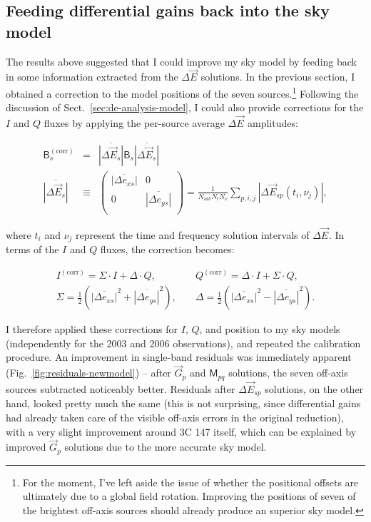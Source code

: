 \documentclass{aa}
\newcommand{\matrixtt}[4]{\left( \begin{array}{cc}#1&#2\\#3&#4\\\end{array} \right)}
\newcommand{\jones}[2]{\vec {#1}_{#2}}
\newcommand{\coh}[2]{\mathsf{{#1}}_{{#2}}}
\begin{document}
\subsection{Feeding differential gains back into the sky model\label{sec:model-improvement}}

The results above suggested that I could improve my sky model by feeding back in some information extracted from the $\Delta\jones{E}{}$ solutions. In the previous section, I obtained a correction to the model positions of the seven sources.\footnote{For the moment, I've left aside the issue of whether the positional offsets are ultimately due to a global field rotation. Improving the positions of seven of the brightest off-axis sources should already produce an superior sky model.} Following the discussion of Sect.~\ref{sec:de-analysis-model}, I could also provide corrections for the $I$ and $Q$ fluxes by applying the per-source average $\Delta\jones{E}{}$ amplitudes:

\begin{eqnarray*}
\coh{B}{s}^\mathrm{(corr)} & = & \overline{|\Delta\jones{E}{s}|} \coh{B}{s} \overline{|\Delta\jones{E}{s}|} \\
\overline{|\Delta\jones{E}{s}|} & \equiv & \matrixtt{\overline{|\Delta e_{xs}|}}{0}{0}{\overline{|\Delta e_{ys}|}} = \frac{1}{N_\mathrm{ant}N_t N_\nu} \sum_{p,i,j} |\Delta\jones{E}{sp}(t_i,\nu_j)|,
\end{eqnarray*}

where $t_i$ and $\nu_j$ represent the time and frequency solution intervals of $\Delta\jones{E}{}$. In terms of the $I$ and $Q$ fluxes, the correction becomes:

\begin{eqnarray*}
I^\mathrm{(corr)} = \Sigma \cdot I + \Delta \cdot Q, & \; &  Q^\mathrm{(corr)} = \Delta \cdot I + \Sigma \cdot Q, \\
\Sigma = \frac{1}{2}\left( \overline{|\Delta e_{xs}|}^2 + \overline{|\Delta e_{ys}|}^2 \right), 
& \; & \Delta = \frac{1}{2}\left( \overline{|\Delta e_{xs}|}^2 - \overline{|\Delta e_{ys}|}^2 \right).
\end{eqnarray*}

I therefore applied these corrections for $I$, $Q$, and position to my sky models (independently for the 2003 and 2006 observations), and repeated the calibration procedure. An improvement in single-band residuals was immediately apparent (Fig.~\ref{fig:residuals-newmodel}) -- after $\jones{G}{p}$ and $\coh{M}{pq}$ solutions, the seven off-axis sources subtracted noticeably better. Residuals after $\Delta\jones{E}{sp}$ solutions, on the other hand, looked pretty much the same (this is not surprising, since differential gains had already taken care of the visible off-axis errors in the original reduction), with a very slight improvement around 3C 147 itself,
which can be explained by improved $\jones{G}{p}$ solutions due to the more accurate sky model.
\end{document}
